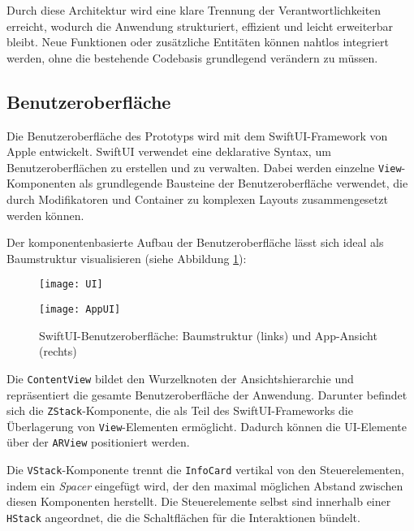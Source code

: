 Durch diese Architektur wird eine klare Trennung der Verantwortlichkeiten erreicht, wodurch die Anwendung strukturiert, effizient und leicht erweiterbar bleibt. Neue Funktionen oder zusätzliche Entitäten können nahtlos integriert werden, ohne die bestehende Codebasis grundlegend verändern zu müssen.

\subsection{Benutzeroberfläche}

Die Benutzeroberfläche des Prototyps wird mit dem SwiftUI-Framework von Apple entwickelt. SwiftUI verwendet eine deklarative Syntax, um Benutzeroberflächen zu erstellen und zu verwalten. Dabei werden einzelne \texttt{View}-Komponenten als grundlegende Bausteine der Benutzeroberfläche verwendet, die durch Modifikatoren und Container zu komplexen Layouts zusammengesetzt werden können. \cite{appledevdoc}

Der komponentenbasierte Aufbau der Benutzeroberfläche lässt sich ideal als Baumstruktur visualisieren (siehe Abbildung \ref{fig:AppUI}):

\begin{figure}[ht]
    \centering
    \begin{minipage}{0.45\textwidth}
        \centering
        \texttt{[image: UI]}
    \end{minipage}
    \hfill
    \begin{minipage}{0.45\textwidth}
        \centering
        \texttt{[image: AppUI]}
    \end{minipage}
    \caption{SwiftUI-Benutzeroberfläche: Baumstruktur (links) und App-Ansicht (rechts)}
    \label{fig:AppUI}
\end{figure}

Die \texttt{ContentView} bildet den Wurzelknoten der Ansichtshierarchie und repräsentiert die gesamte Benutzeroberfläche der Anwendung. Darunter befindet sich die \texttt{ZStack}-Komponente, die als Teil des SwiftUI-Frameworks die Überlagerung von \texttt{View}-Elementen ermöglicht. Dadurch können die UI-Elemente über der \texttt{ARView} positioniert werden.

Die \texttt{VStack}-Komponente trennt die \texttt{InfoCard} vertikal von den Steuerelementen, indem ein \textit{Spacer} eingefügt wird, der den maximal möglichen Abstand zwischen diesen Komponenten herstellt. Die Steuerelemente selbst sind innerhalb einer \texttt{HStack} angeordnet, die die Schaltflächen für die Interaktionen bündelt.

